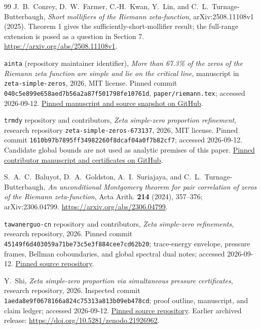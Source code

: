 \documentclass[11pt]{article}
\theoremstyle{remark}
\begin{document}
\begin{thebibliography}{99}
J.~B.~Conrey, D.~W.~Farmer, C.-H.~Kwan, Y.~Lin, and
C.~L.~Turnage-Butterbaugh,
\emph{Short mollifiers of the Riemann zeta-function},
arXiv:2508.11108v1 (2025).
Theorem 1 gives the sufficiently-short-mollifier result; the full-range
extension is posed as a question in Section 7.
\url{https://arxiv.org/abs/2508.11108v1}.

\texttt{ainta} (repository maintainer identifier),
\emph{More than 67.3\% of the zeros of the Riemann zeta function are
simple and lie on the critical line}, manuscript in
\texttt{zeta-simple-zeros}, 2026, MIT license.
Pinned commit \texttt{040c5e899e658aed7b56a2a87f501798fe10761d},
\texttt{paper/riemann.tex}; accessed 2026-09-12.
\href{https://github.com/ainta/zeta-simple-zeros/tree/040c5e899e658aed7b56a2a87f501798fe10761d}{Pinned manuscript and source snapshot on GitHub}.

\texttt{trmdy} repository and contributors,
\emph{Zeta simple-zero proportion refinement}, research repository
\texttt{zeta-simple-zeros-673137}, 2026, MIT license.
Pinned commit \texttt{1610b97b7895ff34982260f8dcaf04a0f7b82cf7};
accessed 2026-09-12. Candidate global bounds are not used as analytic
premises of this paper.
\href{https://github.com/trmdy/zeta-simple-zeros-673137/tree/1610b97b7895ff34982260f8dcaf04a0f7b82cf7}{Pinned contributor manuscript and certificates on GitHub}.

S.~A.~C.~Baluyot, D.~A.~Goldston, A.~I.~Suriajaya, and C.~L.~Turnage-Butterbaugh,
\emph{An unconditional Montgomery theorem for pair correlation of zeros
of the Riemann zeta-function}, Acta Arith. \textbf{214} (2024), 357--376;
arXiv:2306.04799.
\url{https://arxiv.org/abs/2306.04799}.

\texttt{tawanerguo-cn} repository and contributors,
\emph{Zeta simple-zero refinements}, research repository, 2026.
Pinned commit \texttt{45149f6d403059a71be73c5e3f884cee7cd62b20};
trace-energy envelope, pressure frames, Bellman coboundaries, and global
spectral dual notes; accessed 2026-09-12.
\href{https://github.com/tawanerguo-cn/zeta-simple-zeros/tree/45149f6d403059a71be73c5e3f884cee7cd62b20}{Pinned source repository}.

Y.~Shi,
\emph{Zeta simple-zero proportion via simultaneous pressure certificates},
research repository, 2026. Inspected commit
\texttt{1aeda8e9f0678166a824c75313a813b09eb478cd};
proof outline, manuscript, and claim ledger; accessed 2026-09-12.
\href{https://github.com/yuhangshi888/zeta-simple-zeros-673316977/tree/1aeda8e9f0678166a824c75313a813b09eb478cd}{Pinned source repository}.
Earlier archived release: \url{https://doi.org/10.5281/zenodo.21926962}.


\end{thebibliography}
\end{document}
